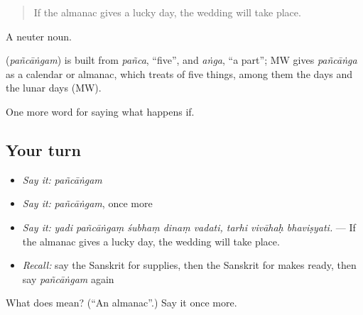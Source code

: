 \begin{quote}
If the almanac gives a lucky day, the wedding will take place.
\end{quote}

A neuter noun.

\begin{cousinweb}
\textbf{} (\emph{pañcāṅgam}) is built from \emph{pañca}, \textquotedblleft{}five\textquotedblright{}, and \emph{aṅga}, \textquotedblleft{}a part\textquotedblright{}; MW gives \emph{pañcāṅga} as a calendar or almanac, which treats of five things, among them the days and the lunar days (MW).
\end{cousinweb}

\begin{grammarlens}[title={What you've built}]
One more word for saying what happens if.
\end{grammarlens}

\subsection*{Your turn}
\begin{itemize}
\raggedright
  \item \emph{Say it:} \emph{pañcāṅgam}
  \item \emph{Say it:} \emph{pañcāṅgam}, once more
  \item \emph{Say it:} \emph{yadi pañcāṅgaṃ śubhaṃ dinaṃ vadati, tarhi vivāhaḥ bhaviṣyati.} — If the almanac gives a lucky day, the wedding will take place.
  \item \emph{Recall:} say the Sanskrit for supplies, then the Sanskrit for makes ready, then say \emph{pañcāṅgam} again
\end{itemize}

\begin{tcolorbox}[breakable,colback=teal!4,colframe=teal!35!black,title={Before you move on}]
What does  mean? (\textquotedblleft{}An almanac\textquotedblright{}.) Say it once more.
\end{tcolorbox}
